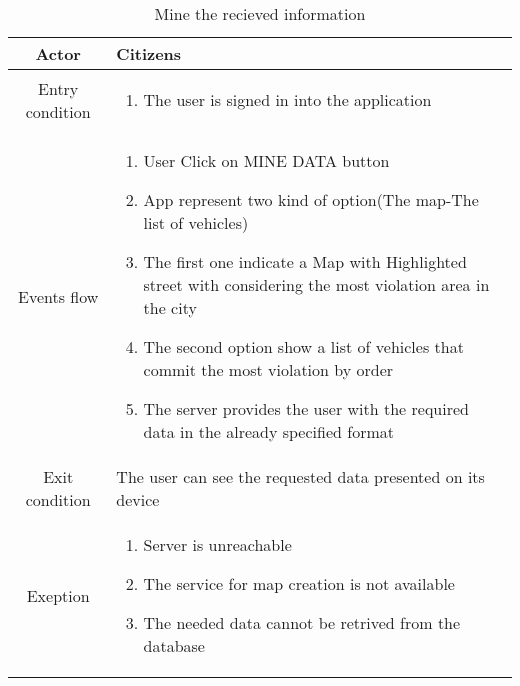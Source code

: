 \documentclass{article}
\begin{document}
		\begin{table} [H]
		\begin{center}
		\caption{Mine the recieved information}
		\begin{tabular}{|c|p{8cm}|}
			\hline
			Actor&Citizens\\
			\hline
			Entry condition& \begin{enumerate}
								\item The user is signed in into the application
							\end{enumerate}\\
			\hline
			 Events flow& \begin{enumerate}
							\item User Click on MINE DATA button			
							\item App represent two kind of option(The map-The list of vehicles)
							\item The first one indicate a Map with Highlighted street with considering the most violation area in the city
							\item The second option show a list of vehicles that commit the most violation by order %
							\item The server provides the user with the required data in the already specified format
						\end{enumerate}\\
			\hline
			Exit condition & The user can see the requested data presented on its device\\
			\hline
			Exeption& \begin{enumerate}
						\item Server is unreachable
						\item The service for map creation is not available
						\item The needed data cannot be retrived from the database
					\end{enumerate}\\
			\hline
		\end{tabular}
		\end{center}
		\end{table} 
		
\end{document}
